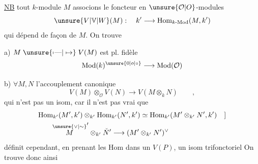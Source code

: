 
\uline{NB}  tout $k$-module $M$ associons le foncteur en $\unsure{\mathcal O|O}$-modules
\[
 \unsure{V|\mathbb V|W}(M):\quad k'\longrightarrow\mathrm{Hom}_{k\text{-}\mathrm{Mod}}(M,k')
\]
qui dépend de façon  de $M$. On trouve

a) $M\mathrel{\unsure{\mapstochar\text{---}|\mapsto}}V(M)$  est pl. fidèle 
\[
 \mathrm{Mod}(k)^{\unsure{0|o|\circ}}\longrightarrow\mathrm{Mod}(\mathcal O)
\]

b) $\forall M,N$ \deleted{\unsure{$\xi$|:}} l'accouplement canonique
\[
 V(M)\otimes_{\mathcal O}V(N)\longrightarrow V(M\otimes_k N)\qquad,
\]
\unsure{[|(}qui n'est pas un isom, car il n'est pas vrai que
\[
\begin{aligned}
 &\mathrm{Hom}_{k'}(M',k')\otimes_{k'}\mathrm{Hom}_{k'}(N',k')
 \simeq\mathrm{Hom}_{k'}(M'\otimes_{k'}N',k')\quad ]\\
 &\qquad \overset{\unsure{\vee|\sim}}{M}'\otimes_{k'}\check N'\longrightarrow(M'\otimes_{k'}N')^{\vee}
\end{aligned}
\]
définit cependant, en prenant les $\mathrm{Hom}$ dans  un $V(P)$, un isom trifonctoriel
On trouve donc ainsi

